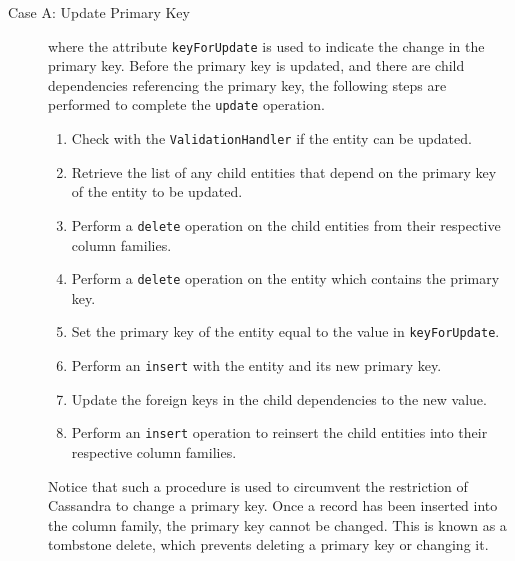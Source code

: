 		\begin{description}
			\item [Case A: Update Primary Key]  where the attribute
			\texttt{keyForUpdate} is used to indicate the change in the primary key.
			Before the primary key is updated, and there are child dependencies referencing
			the primary key,  the following steps are performed to complete the
			\texttt{update} operation.
			\begin{enumerate}
			  \item Check with the \texttt{ValidationHandler} if the entity can be
			  updated. 
			  \item Retrieve the list of any child entities that depend on the 
			  primary key of the entity to be updated. 
			  \item Perform a \texttt{delete} operation on the child entities from their
			  respective column families. 
			  \item Perform a \texttt{delete} operation on the entity which contains  the
			  primary key. 
			  \item Set the primary key of the entity equal to the value in
			  \texttt{keyForUpdate}.
			  \item Perform an \texttt{insert} with the entity and its new primary key. 
			  \item Update the foreign keys in the child dependencies to
			  the new value. 
			  \item Perform an \texttt{insert} operation to reinsert the child entities
			  into their respective column families. 
			\end{enumerate}
		
		
			Notice that such a procedure is used to circumvent  the restriction of
			Cassandra to change a primary key.  Once a record has been
			inserted into the column family,  the primary key cannot  be changed.  This is
			known as a tombstone delete,  which prevents deleting a primary key or
			changing it. 
		

\end{description}
